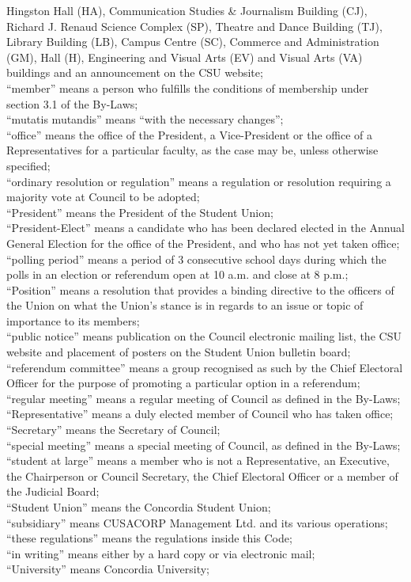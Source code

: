 \documentclass[oneside]{book}
\begin{document}
Hingston Hall (HA), Communication Studies \& Journalism Building (CJ),
Richard J. Renaud Science Complex (SP), Theatre and Dance Building
(TJ), Library Building (LB), Campus Centre (SC), Commerce and Administration
(GM), Hall (H), Engineering and Visual Arts (EV) and Visual Arts (VA)
buildings and an announcement on the CSU website; \\
``member'' means a person who fulfills the
conditions of membership under section 3.1 of the By-Laws; \\
``mutatis mutandis'' means ``with
the necessary changes''; \\
``office'' means the office of the President,
a Vice-President or the office of a Representatives for a particular
faculty, as the case may be, unless otherwise specified; \\
``ordinary resolution or regulation'' means a regulation or resolution
requiring a majority vote at Council to be adopted; \\
``President'' means the President of the
Student Union; \\
``President-Elect'' means a candidate who
has been declared elected in the Annual General Election for the office
of the President, and who has not yet taken office; \\
``polling period'' means a period of 3 consecutive
school days during which the polls in an election or referendum open
at 10 a.m. and close at 8 p.m.; \\
“Position” means a resolution that provides a binding directive to the 
officers of the Union on what the Union’s stance is in regards to an issue 
or topic of importance to its members; \\
``public notice'' means publication on the
Council electronic mailing list, the CSU website and placement of
posters on the Student Union bulletin board; \\
``referendum committee'' means a group recognised
as such by the Chief Electoral Officer for the purpose of promoting
a particular option in a referendum; \\
``regular meeting'' means a regular meeting
of Council as defined in the By-Laws; \\
``Representative'' means a duly elected
member of Council who has taken office; \\
``Secretary'' means the Secretary of Council;
\\
``special meeting'' means a special meeting
of Council, as defined in the By-Laws; \\
``student at large'' means a member who
is not a Representative, an Executive, the Chairperson or Council
Secretary, the Chief Electoral Officer or a member of the Judicial
Board; \\
``Student Union'' means the Concordia Student
Union; \\
``subsidiary'' means CUSACORP Management
Ltd. and its various operations; \\
``these regulations'' means the regulations
inside this Code; \\
``in writing'' means either by a hard copy
or via electronic mail; \\
``University'' means Concordia University; 
\setcounter{secnumdepth}{3}
\end{document}
